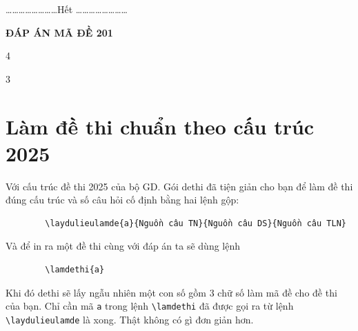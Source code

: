 	\lamtieude
	\setcounter{socauhoi}{0}
	\begin{enumerate}[]
		\foreachproblem[tnkq]{\item\causo\thisproblem}
	\end{enumerate}
	\setcounter{socauhoi}{0}
	\begin{enumerate}[]
		\foreachproblem[ds]{\item\causo\thisproblem}
	\end{enumerate}
	\setcounter{socauhoi}{0}
	\begin{enumerate}[]
		\foreachproblem[tln]{\item\causo\thisproblem}
	\end{enumerate}
	\label{dbPage}
	\centerline{\ldots\ldots\ldots\ldots\ldots\ldots\ldots\ldots Hết \ldots\ldots\ldots\ldots\ldots\ldots\ldots\ldots}
	\centerline{\bfseries ĐÁP ÁN MÃ ĐỀ 201}
	\setcounter{socauhoi}{0}
	\setcounter{socauhoi}{0}
	\indapanlietke
	\begin{multicols}{4}
		\begin{enumerate}[]
			\foreachproblem[ds]{\item\causo\thisproblem}
		\end{enumerate}
	\end{multicols}
	\setcounter{socauhoi}{0}
	\indapanlietke
	\begin{multicols}{3}
		\begin{enumerate}[]
			\foreachproblem[tln]{\item\causo\thisproblem}
		\end{enumerate}
	\end{multicols}
	
	\section{Làm đề thi chuẩn theo cấu trúc 2025}
	Với cấu trúc đề thi 2025 của bộ GD. Gói dethi đã tiện giản cho bạn để làm đề thi đúng cấu trúc và số câu hỏi cố định bằng hai lệnh gộp:
	\begin{verbatim}
		\laydulieulamde{a}{Nguồn câu TN}{Nguồn câu DS}{Nguồn câu TLN}
	\end{verbatim}
	Và để in ra một đề thi cùng với đáp án ta sẽ dùng lệnh
	\begin{verbatim}
		\lamdethi{a}
	\end{verbatim}
	Khi đó dethi sẽ lấy ngẫu nhiên một con số gồm 3 chữ số làm mã đề cho đề thi của bạn. Chỉ cần mã \verb'a'  trong lệnh \verb'\lamdethi' đã được gọi ra từ lệnh \verb'\laydulieulamde' là xong. Thật không có gì đơn giản hơn.
	
